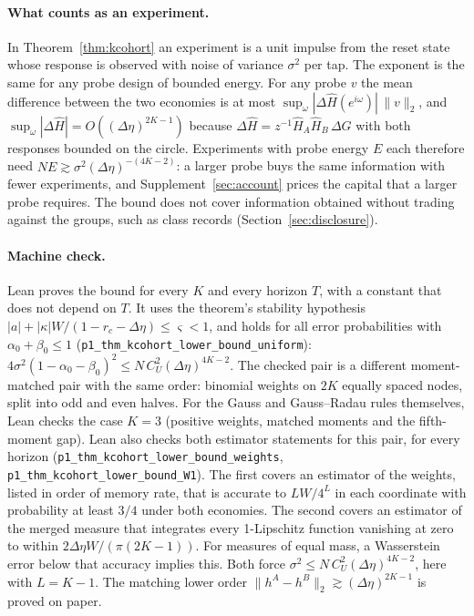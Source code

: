 \documentclass[12pt]{article}
\theoremstyle{definition}
\theoremstyle{remark}
\begin{document}
\paragraph{What counts as an experiment.} In Theorem~\ref{thm:kcohort} an experiment is a unit impulse from the reset state whose response is observed with noise of variance $\sigma^2$ per tap. The exponent is the same for any probe design of bounded energy. For any probe $v$ the mean difference between the two economies is at most $\sup_\omega|\Delta\hat H(e^{i\omega})|\,\|v\|_2$, and $\sup_\omega|\Delta\hat H|=O((\Delta\eta)^{2K-1})$ because $\Delta\hat H=z^{-1}\hat H_A\hat H_B\,\Delta G$ with both responses bounded on the circle. Experiments with probe energy $E$ each therefore need $NE\gtrsim\sigma^2(\Delta\eta)^{-(4K-2)}$: a larger probe buys the same information with fewer experiments, and Supplement~\ref{sec:account} prices the capital that a larger probe requires. The bound does not cover information obtained without trading against the groups, such as class records (Section~\ref{sec:disclosure}).

\paragraph{Machine check.} Lean proves the bound for every $K$ and every horizon $T$, with a constant that does not depend on $T$. It uses the theorem's stability hypothesis $|a|+|\kappa|W/(1-r_c-\Delta\eta)\le\varsigma<1$, and holds for all error probabilities with $\alpha_0+\beta_0\le1$ (\nolinkurl{p1_thm_kcohort_lower_bound_uniform}): $4\sigma^2(1-\alpha_0-\beta_0)^2\le N\,C_U^2(\Delta\eta)^{4K-2}$. The checked pair is a different moment-matched pair with the same order: binomial weights on $2K$ equally spaced nodes, split into odd and even halves. For the Gauss and Gauss--Radau rules themselves, Lean checks the case $K=3$ (positive weights, matched moments and the fifth-moment gap). Lean also checks both estimator statements for this pair, for every horizon (\nolinkurl{p1_thm_kcohort_lower_bound_weights}, \nolinkurl{p1_thm_kcohort_lower_bound_W1}). The first covers an estimator of the weights, listed in order of memory rate, that is accurate to $LW/4^L$ in each coordinate with probability at least $3/4$ under both economies. The second covers an estimator of the merged measure that integrates every 1-Lipschitz function vanishing at zero to within $2\Delta\eta W/(\pi(2K-1))$. For measures of equal mass, a Wasserstein error below that accuracy implies this. Both force $\sigma^2\le N\,C_U^2(\Delta\eta)^{4K-2}$, here with $L=K-1$. The matching lower order $\|h^A-h^B\|_2\gtrsim(\Delta\eta)^{2K-1}$ is proved on paper.
\end{document}
